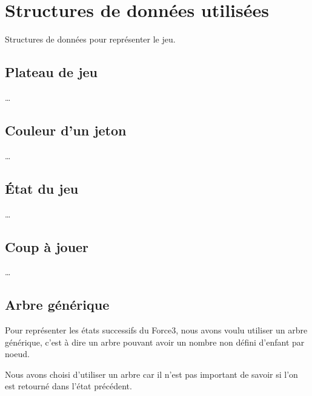 \chapter{Structures de données utilisées} \label{chapter:structures-donnees}

Structures de données pour représenter le jeu.

\section{Plateau de jeu}

…

\section{Couleur d'un jeton}

…

\section{État du jeu}

…

\section{Coup à jouer}

…

\section{Arbre générique}

Pour représenter les états successifs du Force3, nous avons voulu utiliser un
arbre générique, c'est à dire un arbre pouvant avoir un nombre non défini
d'enfant par noeud.

Nous avons choisi d'utiliser un arbre car il n'est pas important de savoir si
l'on est retourné dans l'état précédent.

